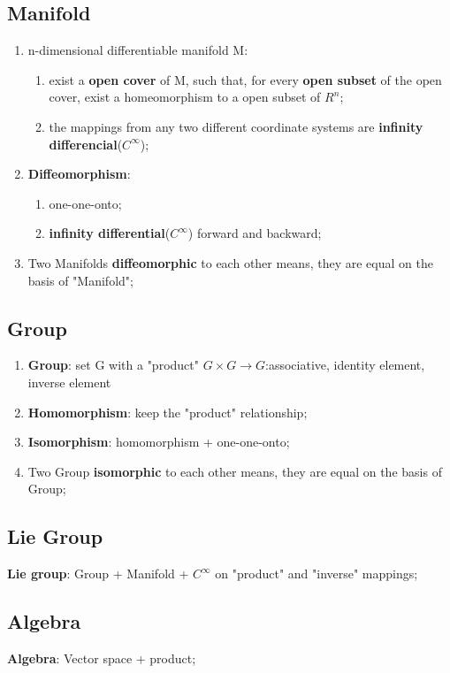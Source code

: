 \documentclass[12pt]{article}
\numberwithin{equation}{section}
\begin{document}
\subsection{Manifold}
	\begin{enumerate}
	\item n-dimensional differentiable manifold M: 
		\begin{enumerate}
			\item exist a \textbf{open cover} of M, such that, for every \textbf{open subset} of the open cover, exist a homeomorphism to a open subset of $R^n$; 
			\item the mappings from any two different coordinate systems are \textbf{infinity differencial}($C^\infty$);
		\end{enumerate}
	\item \textbf{Diffeomorphism}: 
		\begin{enumerate}
			\item one-one-onto; 
			\item \textbf{infinity differential}($C^\infty$) forward and backward;
		\end{enumerate}
	\item Two Manifolds \textbf{diffeomorphic} to each other means, they are equal on the basis of "Manifold";
	\end{enumerate}
\subsection{Group}
	\begin{enumerate}
	\item \textbf{Group}: set G with a "product" $G\times G\rightarrow G$:associative, identity element, inverse element
	\item \textbf{Homomorphism}: keep the "product" relationship;
	\item \textbf{Isomorphism}: homomorphism + one-one-onto;
	\item Two Group \textbf{isomorphic} to each other means, they are equal on the basis of Group;
	\end{enumerate}
\subsection{Lie Group}
	\textbf{Lie group}: Group + Manifold + $C^\infty$ on "product" and "inverse" mappings;
\subsection{Algebra}
	\textbf{Algebra}: Vector space + product;
\end{document}
